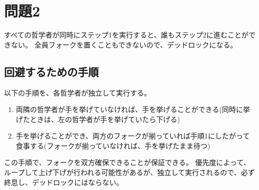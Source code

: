 \documentclass[a4paper,10pt]{jsarticle}
\begin{document}
\section{問題2}
すべての哲学者が同時にステップ1を実行すると、誰もステップ2に進むことができない。
全員フォークを置くこともできないので、デッドロックになる。

\subsection{回避するための手順}
以下の手順を、各哲学者が独立して実行する。

\begin{enumerate}
  \item 両隣の哲学者が手を挙げていなければ、手を挙げることができる(同時に挙げたときは、左の哲学者が手を挙げていたら下げる)
  \item 手を挙げることができ、両方のフォークが揃っていれば手順1にしたがって食事する(フォークが揃っていなければ、手を挙げたまま待つ)
\end{enumerate}

この手順で、フォークを双方確保できることが保証できる。
優先度によって、ループして上げ下げが行われる可能性があるが、独立して実行されるので、必ず終息し、デッドロックにはならない。
\end{document}
